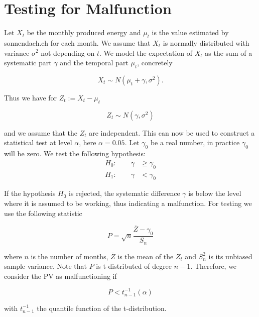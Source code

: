 \documentclass{article}
\begin{document}
\section*{Testing for Malfunction}

Let $X_t$ be the monthly produced energy and $\mu_t$ is the value estimated by sonnendach.ch for each month.
We assume that $X_t$ is normally distributed with variance $\sigma^2$ not depending on $t$. 
We model the expectation of $X_t$ as the sum of a systematic part $\gamma$ and the temporal part $\mu_t$, concretely

\[ X_t \sim N( \mu_t + \gamma, \sigma^2). \]

Thus we have for $Z_t := X_t - \mu_t$

\[ Z_t \sim N( \gamma, \sigma^2 ) \]
 
and we assume that the $Z_t$ are independent.
This can now be used to construct a statistical test at level $\alpha$, here $\alpha=0.05$. Let $\gamma_0$ be a real number, in practice $\gamma_0$ will be zero.
We test the following hypothesis:
\begin{align*}
      H_0: \qquad \gamma & \ge \gamma_0  \\
      H_1: \qquad \gamma & < \gamma_0 
\end{align*}

If the hypothesis $H_0$ is rejected, the systematic difference $\gamma$ is below the level where it is assumed to be working, thus indicating a malfunction. For testing we use the following statistic

\[ P = \sqrt{n} \frac{\overline{Z}-\gamma_0}{S_n} \]

where $n$ is the number of months, $\overline{Z}$ is the mean of the $Z_t$ and $S_n^2$ is its unbiased sample variance.
Note that $P$ is t-distributed of degree $n-1$. Therefore, we consider the PV as malfunctioning if

\[ P < t_{n-1}^{-1}(\alpha) \]

with $t_{n-1}^{-1}$ the quantile function of the t-distribution.
\end{document}
